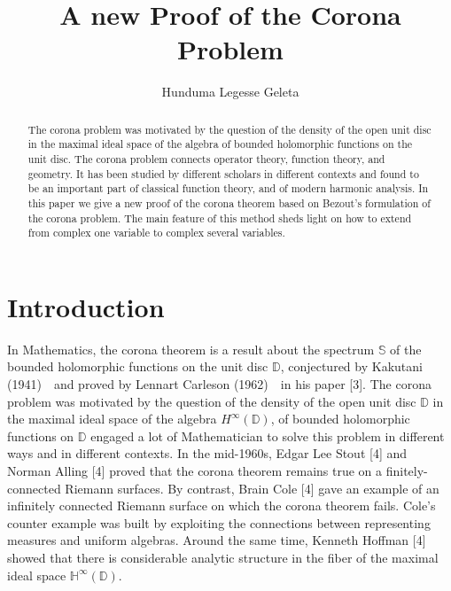 \documentclass[reqno, 12pt]{amsart}
\theoremstyle{definition}
\theoremstyle{definition}
\begin{document}
\title{A new Proof of the Corona Problem  }
\author{Hunduma Legesse Geleta}
\address{Addis Ababa Univesity, College of natural and Computational Sciences, Department of Mathematics}
\address{}
\email{}

\begin{abstract}
 The corona problem was motivated by the question of the density of the open unit disc  in the maximal ideal space of the algebra of bounded holomorphic functions on the unit disc. The corona problem connects operator theory, function theory, and geometry. It has been studied by different scholars in different contexts and found to be an important part of classical function theory, and of modern harmonic analysis. In this paper we give a new  proof of the corona theorem based on  Bezout's formulation of the corona problem. The main feature of this method sheds light on how to extend from complex one variable to complex several variables.  
\end{abstract}

\maketitle
\def\theequation{\thesection.\arabic{equation}}
\section{Introduction}








In Mathematics, the corona theorem is a result about the spectrum $\mathbb{S}$ of the bounded holomorphic functions on the unit disc $\mathbb{D}$, conjectured by Kakutani (1941)~~and proved by Lennart Carleson (1962)~~in his paper [3]. 
 The corona problem was motivated by the question of the density of the open unit disc $\mathbb{D}$ in the maximal ideal space of the algebra $H^\infty(\mathbb{D})$, of bounded holomorphic functions on $\mathbb{D}$ engaged a lot of Mathematician  to solve this problem in different ways and in different contexts. 
In the mid-1960s, Edgar Lee Stout [4] and Norman Alling [4] proved that the corona theorem remains true on a finitely-connected Riemann surfaces. By contrast, Brain Cole [4] gave an example of an infinitely connected Riemann surface on which the corona theorem fails. Cole's counter example was built by exploiting the connections between representing measures and uniform algebras. Around the same time, Kenneth Hoffman [4] showed that there is considerable analytic structure in the fiber of the maximal ideal space $\mathbb{H}^\infty(\mathbb{D})$.
\end{document}
